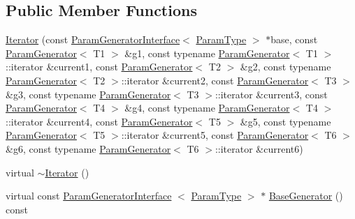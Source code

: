 \subsection*{\-Public \-Member \-Functions}
\begin{DoxyCompactItemize}
\item 
\hyperlink{classtesting_1_1internal_1_1CartesianProductGenerator6_1_1Iterator_ab00917dd367391d5fadaf301ba260113}{\-Iterator} (const \hyperlink{classtesting_1_1internal_1_1ParamGeneratorInterface}{\-Param\-Generator\-Interface}$<$ \hyperlink{classtesting_1_1internal_1_1CartesianProductGenerator6_a2f46503012c4ef785ad3fe03defbc7e1}{\-Param\-Type} $>$ $\ast$base, const \hyperlink{classtesting_1_1internal_1_1ParamGenerator}{\-Param\-Generator}$<$ \-T1 $>$ \&g1, const typename \hyperlink{classtesting_1_1internal_1_1ParamGenerator}{\-Param\-Generator}$<$ \-T1 $>$\-::iterator \&current1, const \hyperlink{classtesting_1_1internal_1_1ParamGenerator}{\-Param\-Generator}$<$ \-T2 $>$ \&g2, const typename \hyperlink{classtesting_1_1internal_1_1ParamGenerator}{\-Param\-Generator}$<$ \-T2 $>$\-::iterator \&current2, const \hyperlink{classtesting_1_1internal_1_1ParamGenerator}{\-Param\-Generator}$<$ \-T3 $>$ \&g3, const typename \hyperlink{classtesting_1_1internal_1_1ParamGenerator}{\-Param\-Generator}$<$ \-T3 $>$\-::iterator \&current3, const \hyperlink{classtesting_1_1internal_1_1ParamGenerator}{\-Param\-Generator}$<$ \-T4 $>$ \&g4, const typename \hyperlink{classtesting_1_1internal_1_1ParamGenerator}{\-Param\-Generator}$<$ \-T4 $>$\-::iterator \&current4, const \hyperlink{classtesting_1_1internal_1_1ParamGenerator}{\-Param\-Generator}$<$ \-T5 $>$ \&g5, const typename \hyperlink{classtesting_1_1internal_1_1ParamGenerator}{\-Param\-Generator}$<$ \-T5 $>$\-::iterator \&current5, const \hyperlink{classtesting_1_1internal_1_1ParamGenerator}{\-Param\-Generator}$<$ \-T6 $>$ \&g6, const typename \hyperlink{classtesting_1_1internal_1_1ParamGenerator}{\-Param\-Generator}$<$ \-T6 $>$\-::iterator \&current6)
\item 
virtual \hyperlink{classtesting_1_1internal_1_1CartesianProductGenerator6_1_1Iterator_a47b331bac1d130f2bab2c40e76ccb54a}{$\sim$\-Iterator} ()
\item 
virtual const \*
\hyperlink{classtesting_1_1internal_1_1ParamGeneratorInterface}{\-Param\-Generator\-Interface}\*
$<$ \hyperlink{classtesting_1_1internal_1_1CartesianProductGenerator6_a2f46503012c4ef785ad3fe03defbc7e1}{\-Param\-Type} $>$ $\ast$ \hyperlink{classtesting_1_1internal_1_1CartesianProductGenerator6_1_1Iterator_a297272d14c33d1d5423da2a4776f895b}{\-Base\-Generator} () const 

\end{DoxyCompactItemize}
